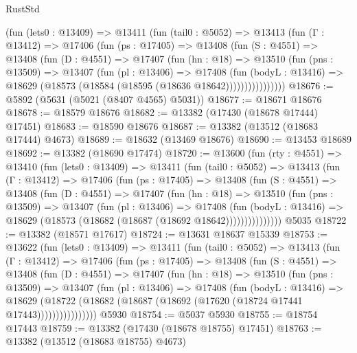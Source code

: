 \begin{lexlean}{RustStd}
\begin{coremodule}
        (fun (lets0 : @13409) =>
        @13411
          (fun (tail0 : @5052) =>
          @13413
            (fun (Γ : @13412) =>
            @17406
              (fun (ps : @17405) =>
              @13408
                (fun (S : @4551) =>
                @13408
                  (fun (D : @4551) =>
                  @17407
                    (fun (hn : @18) =>
                    @13510
                      (fun (pns : @13509) =>
                      @13407
                        (fun (pl : @13406) =>
                        @17408
                          (fun (bodyL : @13416) =>
                          @18629 (@18573 (@18584 (@18595 (@18636 @18642))))))))))))))))
@18676 := @5892 (@5631 (@5021 (@8407 @4565) @5031))
@18677 := @18671 @18676
@18678 := @18579 @18676
@18682 := @13382 (@17430 (@18678 @17444) @17451)
@18683 := @18590 @18676
@18687 := @13382 (@13512 (@18683 @17444) @4673)
@18689 := @18632 (@13469 @18676)
@18690 := @13453 @18689
@18692 := @13382 (@18690 @17474)
@18720 := @13600
    (fun (rty : @4551) =>
    @13410
      (fun (lets0 : @13409) =>
      @13411
        (fun (tail0 : @5052) =>
        @13413
          (fun (Γ : @13412) =>
          @17406
            (fun (ps : @17405) =>
            @13408
              (fun (S : @4551) =>
              @13408
                (fun (D : @4551) =>
                @17407
                  (fun (hn : @18) =>
                  @13510
                    (fun (pns : @13509) =>
                    @13407
                      (fun (pl : @13406) =>
                      @17408
                        (fun (bodyL : @13416) =>
                        @18629 (@18573 (@18682 (@18687 (@18692 @18642)))))))))))))))
    @5035
@18722 := @13382 (@18571 @17617)
@18724 := @13631 @18637 @15339
@18753 := @13622
    (fun (lets0 : @13409) =>
    @13411
      (fun (tail0 : @5052) =>
      @13413
        (fun (Γ : @13412) =>
        @17406
          (fun (ps : @17405) =>
          @13408
            (fun (S : @4551) =>
            @13408
              (fun (D : @4551) =>
              @17407
                (fun (hn : @18) =>
                @13510
                  (fun (pns : @13509) =>
                  @13407
                    (fun (pl : @13406) =>
                    @17408
                      (fun (bodyL : @13416) =>
                      @18629
                        (@18722
                          (@18682 (@18687 (@18692 (@17620 (@18724 @17441 @17443))))))))))))))))
    @5930
@18754 := @5037 @5930
@18755 := @18754 @17443
@18759 := @13382 (@17430 (@18678 @18755) @17451)
@18763 := @13382 (@13512 (@18683 @18755) @4673)

\end{coremodule}
\end{lexlean}
